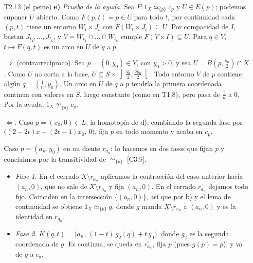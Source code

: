\begin{ejercicio}{T2.13 (el peine)}
\textbf{e)} \emph{Prueba de la ayuda.} Sea $F \colon 1_X \simeq_{\{p\}} c_p$ y $U \in E(p)$; podemos suponer $U$ abierto. Como $F(p,t) = p \in U$ para todo $t$, por continuidad cada $(p,t)$ tiene un entorno $W_t \times J_t$ con $F(W_t \times J_t) \subseteq U$. Por compacidad de $I$, bastan $J_{t_1},\dots,J_{t_k}$, y $V = W_{t_1} \cap \dots \cap W_{t_k}$ cumple $F(V \times I) \subseteq U$. Para $q \in V$, $t \mapsto F(q,t)$ es un arco en $U$ de $q$ a $p$.

\emph{$\Rightarrow$} (contrarrecíproco). Sea $p = (0,y_0) \in Y$, con $y_0 > 0$, y sea $U = B(p,\frac{y_0}{2}) \cap X$. Como $U$ no corta a la base, $U \subseteq S \times \left]\frac{y_0}{2},\frac{3y_0}{2}\right[$. Todo entorno $V$ de $p$ contiene algún $q = (\frac1n,y_0)$. Un arco en $U$ de $q$ a $p$ tendría la primera coordenada continua con valores en $S$, luego constante (como en T1.8), pero pasa de $\frac1n$ a $0$. Por la ayuda, $1_X \not\simeq_{\{p\}} c_p$.

\emph{$\Leftarrow$.} Caso $p = (x_0,0) \in L$: la homotopía de d), cambiando la segunda fase por $\big((2-2t)x + (2t-1)x_0,\,0\big)$, fija $p$ en todo momento y acaba en $c_p$.

Caso $p = (a_n,y_0)$ en un diente $r_{a_n}$: lo hacemos en dos fases que fijan $p$ y concluimos por la transitividad de $\simeq_{\{p\}}$ [C3.9].
\begin{itemize}
    \item \emph{Fase 1.} En el cerrado $X \setminus r_{a_n}$ aplicamos la contracción del caso anterior hacia $(a_n,0)$, que no sale de $X \setminus r_{a_n}$ y fija $(a_n,0)$. En el cerrado $\overline{r_{a_n}}$ dejamos todo fijo. Coinciden en la intersección $\{(a_n,0)\}$, así que por b) y el lema de continuidad se obtiene $1_X \simeq_{\{p\}} g$, donde $g$ manda $X \setminus r_{a_n}$ a $(a_n,0)$ y es la identidad en $\overline{r_{a_n}}$.
    \item \emph{Fase 2.} $K(q,t) = \big(a_n,\,(1-t)\,g_2(q) + t\,y_0\big)$, donde $g_2$ es la segunda coordenada de $g$. Es continua, se queda en $\overline{r_{a_n}}$, fija $p$ (pues $g(p) = p$), y va de $g$ a $c_p$.
\end{itemize}
\end{ejercicio}
